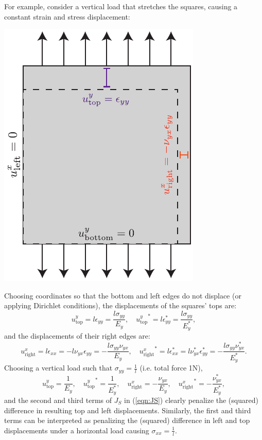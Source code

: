 \documentclass[10pt]{article}
\begin{document}
For example, consider a vertical load that stretches the squares, causing a
constant strain and stress displacement:
\\
\begin{minipage}{\linewidth}
    \centering
    \includegraphics[width=.35\textwidth]{y_load.pdf}
\end{minipage}
Choosing coordinates so that the bottom and left edges do not displace (or
applying Dirichlet conditions), the displacements of the squares' tops are:
$$
u^y_\text{top} = l \epsilon_{yy} = \frac{l \sigma_{yy}}{E_y}, \quad
{u^y_\text{top}}^* = l \epsilon^*_{yy} = \frac{l \sigma_{yy}}{E^*_y},
$$
and the displacements of their right edges are:
$$
u^x_\text{right} = l \epsilon_{xx} = -l \nu_{yx} \epsilon_{yy} = -\frac{l \sigma_{yy} \nu_{yx}}{E_y}, \quad
{u^x_\text{right}}^* = l \epsilon^*_{xx} = l \nu_{yx}^* \epsilon^*_{yy} = -\frac{l \sigma_{yy} \nu_{yx}^*}{E^*_y}.
$$
Choosing a vertical load such that $\sigma_{yy} = \frac{1}{l}$ (i.e. total force 1N),
$$
u^y_\text{top} = \frac{1}{E_y}, \quad {u^y_\text{top}}^* = \frac{1}{E^*_y}, \quad
u^x_\text{right} = -\frac{\nu_{yx}}{E_y}, \quad {u^x_\text{right}}^* = -\frac{\nu_{yx}^*}{E^*_y},
$$
and the second and third terms of $J_S$ in (\ref{eqn:JS}) clearly penalize the
(squared) difference in
resulting top and left displacements. Similarly, the first and third terms can be interpreted as
penalizing the (squared) difference in left and top displacements under a
horizontal load causing $\sigma_{xx} = \frac{1}{l}$.
\end{document}
